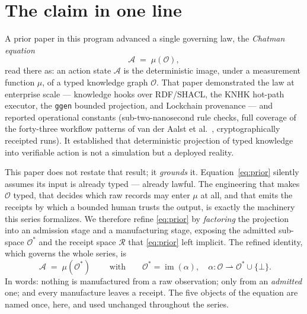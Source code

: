 \documentclass[11pt,oneside]{book}
\theoremstyle{definition}
\theoremstyle{plain}
\theoremstyle{remark}
\newcommand{\Obs}{\mathcal{O}}                 %
\newcommand{\Adm}{\mathcal{O}^{*}}             %
\newcommand{\Act}{\mathcal{A}}                 %
\newcommand{\Rec}{\mathcal{R}}                 %
\newcommand{\muop}{\mu}                        %
\newcommand{\adm}{\alpha}                      %
\newcommand{\Rfsl}{\bot}                        %
\DeclareMathOperator{\im}{im}
\newcommand{\code}[1]{\texttt{#1}}
\begin{document}
\section{The claim in one line}

A prior paper in this program \cite{chatman2025} advanced a single governing
law, the \emph{Chatman equation}
\begin{equation}\label{eq:prior}
\Act \;=\; \muop(\Obs),
\end{equation}
read there as: an action state $\Act$ is the deterministic image, under a measurement
function $\muop$, of a typed knowledge graph $\Obs$. That paper demonstrated the law at
enterprise scale --- knowledge hooks over RDF/SHACL, the KNHK hot-path executor, the
\code{ggen} bounded projection, and Lockchain provenance --- and reported operational
constants (sub-two-nanosecond rule checks, full coverage of the forty-three workflow
patterns of van der Aalst et al.\ \cite{vdaalst2003patterns}, cryptographically
receipted runs). It established that deterministic projection of typed knowledge into
verifiable action is not a simulation but a deployed reality.

This paper does not restate that result; it \emph{grounds} it. Equation~\eqref{eq:prior}
silently assumes its input is already typed --- already lawful. The engineering that makes
$\Obs$ typed, that decides which raw records may enter $\muop$ at all, and that emits the
receipts by which a bounded human trusts the output, is exactly the machinery this series
formalizes. We therefore refine \eqref{eq:prior} by \emph{factoring} the projection into
an admission stage and a manufacturing stage, exposing the admitted sub-space $\Adm$ and
the receipt space $\Rec$ that \eqref{eq:prior} left implicit. The refined identity, which
governs the whole series, is
\begin{equation}\label{eq:chatman}
\boxed{\;\Act \;=\; \muop(\Adm)\;}
\qquad\text{with}\qquad
\Adm=\im(\adm),\quad \adm:\Obs\rightharpoonup\Adm\cup\{\Rfsl\}.
\end{equation}
In words: nothing is manufactured from a raw observation; only from an \emph{admitted}
one; and every manufacture leaves a receipt. The five objects of the equation are named
once, here, and used unchanged throughout the series.
\end{document}
